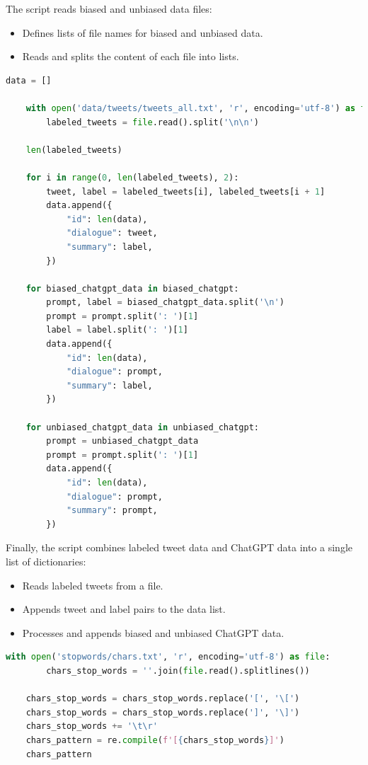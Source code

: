 \documentclass{solutionclass} %
\begin{document}
\begin{solution}
The script reads biased and unbiased data files:

\begin{itemize}
	\item Defines lists of file names for biased and unbiased data.
	\item Reads and splits the content of each file into lists.
\end{itemize}

\end{solution}

\begin{lstlisting}[language=Python]
	data = []
	
	with open('data/tweets/tweets_all.txt', 'r', encoding='utf-8') as file:
		labeled_tweets = file.read().split('\n\n')
	
	len(labeled_tweets)
	
	for i in range(0, len(labeled_tweets), 2):
		tweet, label = labeled_tweets[i], labeled_tweets[i + 1]
		data.append({
			"id": len(data),
			"dialogue": tweet,
			"summary": label,
		})
	
	for biased_chatgpt_data in biased_chatgpt:
		prompt, label = biased_chatgpt_data.split('\n')
		prompt = prompt.split(': ')[1]
		label = label.split(': ')[1]
		data.append({
			"id": len(data),
			"dialogue": prompt,
			"summary": label,
		})
	
	for unbiased_chatgpt_data in unbiased_chatgpt:
		prompt = unbiased_chatgpt_data
		prompt = prompt.split(': ')[1]
		data.append({
			"id": len(data),
			"dialogue": prompt,
			"summary": prompt,
		})
	\end{lstlisting}


\begin{solution}
Finally, the script combines labeled tweet data and ChatGPT data into a single list of dictionaries:

\begin{itemize}
	\item Reads labeled tweets from a file.
	\item Appends tweet and label pairs to the data list.
	\item Processes and appends biased and unbiased ChatGPT data.
\end{itemize}
\end{solution}


\begin{lstlisting}[language=Python]
	with open('stopwords/chars.txt', 'r', encoding='utf-8') as file:
		chars_stop_words = ''.join(file.read().splitlines())
	
	chars_stop_words = chars_stop_words.replace('[', '\[')
	chars_stop_words = chars_stop_words.replace(']', '\]')
	chars_stop_words += '\t\r'
	chars_pattern = re.compile(f'[{chars_stop_words}]')
	chars_pattern
	\end{lstlisting}
\end{document}
